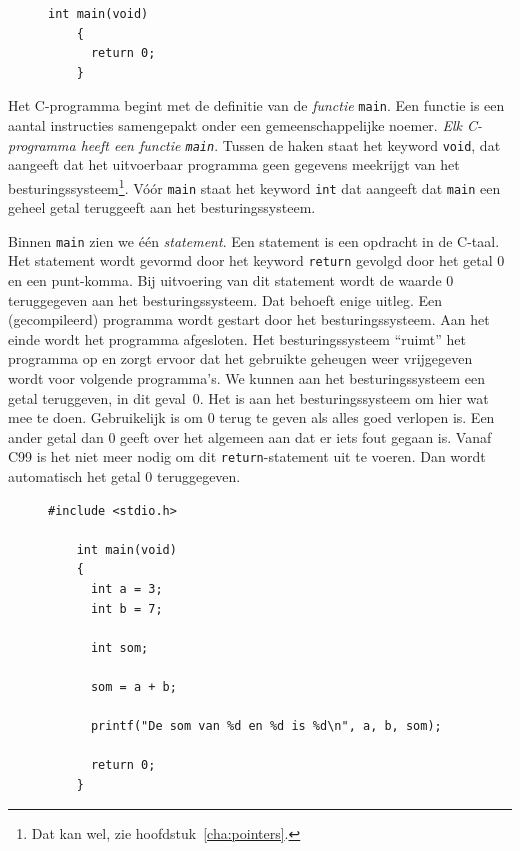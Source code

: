 \documentclass[12pt,a4paper,final,twoside,fleqn]{book}
\begin{document}
\begin{figure}[H]
  \begin{lstlisting}[caption=Een minimaal C-programma.,label=cod:unminimaalcprogramma]
    int main(void)
    {
      return 0;
    }
  \end{lstlisting}
\end{figure}


Het C-programma begint met de definitie van de \textsl{functie} \texttt{main}. Een functie is een aantal instructies samengepakt onder een gemeenschappelijke noemer. \textsl{Elk C-programma heeft een functie \texttt{main}}. Tussen de haken staat het keyword \texttt{void}, dat aangeeft dat het uitvoerbaar programma geen gegevens meekrijgt van het besturingssysteem\footnote{Dat kan wel, zie hoofdstuk~\ref{cha:pointers}.}. Vóór \texttt{main} staat het keyword \texttt{int} dat aangeeft dat \texttt{main} een geheel getal teruggeeft aan het besturingssysteem.





Binnen \texttt{main} zien we één \textsl{statement}. Een statement is een opdracht in de C-taal. Het statement wordt gevormd door het keyword \texttt{return} gevolgd door het getal 0 en een punt-komma. Bij uitvoering van dit statement wordt de waarde 0 teruggegeven aan het besturingssysteem. Dat behoeft enige uitleg. Een (gecompileerd) programma wordt gestart door het besturingssysteem. Aan het einde wordt het programma afgesloten. Het besturingssysteem ``ruimt'' het programma op en zorgt ervoor dat het gebruikte geheugen weer vrijgegeven wordt voor volgende programma's. We kunnen aan het besturingssysteem een getal teruggeven, in dit geval~0. Het is aan het besturingssysteem om hier wat mee te doen. Gebruikelijk is om 0 terug te geven als alles goed verlopen is. Een ander getal dan 0 geeft over het algemeen aan dat er iets fout gegaan is. Vanaf C99 is het niet meer nodig om dit \texttt{return}-statement uit te voeren. Dan wordt automatisch het getal 0 teruggegeven.



\begin{figure}[!ht]
  \begin{lstlisting}[caption=Afdrukken van de som van twee getallen.,label=cod:uneersteprogramma]
    #include <stdio.h>

    int main(void)
    {
      int a = 3;
      int b = 7;

      int som;

      som = a + b;

      printf("De som van %d en %d is %d\n", a, b, som);

      return 0;
    }
  \end{lstlisting}
\end{figure}
\end{document}

